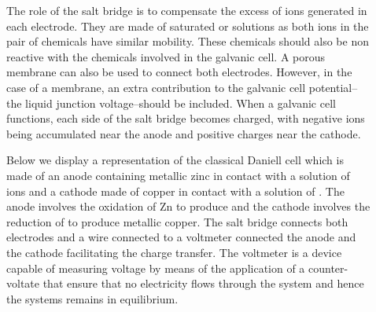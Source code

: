 \documentclass[main.tex]{subfiles}
\newcommand\chapterlabel{electrochem}
\begin{document}
\begin{description}
\item[]
The role of the salt bridge is to compensate the excess of ions generated in each electrode. They are made of saturated  or  solutions as both ions in the pair of chemicals have similar mobility. These chemicals should also be non reactive with the chemicals involved in the galvanic cell. A porous membrane can also be used to connect both electrodes. However, in the case of a membrane, an extra contribution to the galvanic cell potential--the liquid junction voltage--should be included. When a galvanic cell functions, each side of the salt bridge becomes charged, with negative ions being accumulated near the anode and positive charges near the cathode.
\item[]
Below we display a representation of the classical Daniell cell which is made of an anode containing metallic zinc in contact with a solution of  ions and a cathode made of copper in contact with a solution of . The anode involves the oxidation of Zn to produce  and the cathode involves the reduction of  to produce metallic copper. The salt bridge connects both electrodes  and a wire connected to a voltmeter connected the anode and the cathode facilitating the charge transfer. The voltmeter is a device capable of measuring voltage by means of the application of a counter-voltate that ensure that no electricity flows through the system and hence the systems remains in equilibrium.
     \label{Fig:{\chapterlabel}\thefigurenewcounter}
 \begin{center}
\end{center}




\end{description}
\end{document}
